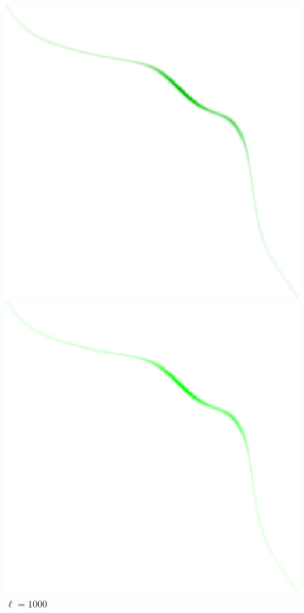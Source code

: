 \documentclass[cn,10pt,math=newtx,citestyle=gb7714-2015,bibstyle=gb7714-2015]{elegantbook}
\begin{document}
\begin{figure}[H]
\begin{minipage}{0.8\linewidth}
\begin{minipage}{0.16\linewidth}
\begin{mdframed}
		\end{mdframed}
		\caption*{$\ell=100$}
	\end{minipage}
	\begin{minipage}{0.16\linewidth}
		\centering
		\begin{mdframed}
		    \includegraphics[width=\linewidth]{figure/fig4.5/evol-img-5.eps}
		\end{mdframed}
		\caption*{$\ell=1000$}
	\end{minipage}
	\begin{minipage}{0.16\linewidth}
		\centering
		\begin{mdframed}
		    \includegraphics[width=\linewidth]{figure/fig4.5/evol-img-6.eps}

\end{mdframed}
\end{minipage}
\end{minipage}
\end{figure}
\end{document}
